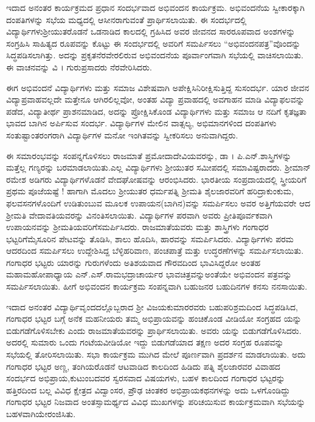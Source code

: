 {ಇದಾದ ಅನಂತರ ಕಾರ್ಯಕ್ರಮದ ಪ್ರಧಾನ ಸಂದರ್ಭವಾದ ಅಭಿವಂದನ ಕಾರ್ಯಕ್ರಮ. ಅಭಿವಂದನೆಯ ಸ್ವೀಕಾರಕ್ಕಾಗಿ ದಂಪತಿಗಳನ್ನು ಸಭೆಯ ಮಧ್ಯದಲ್ಲಿ ಆಸೀನರಾಗುವಂತೆ ಪ್ರಾರ್ಥಿಸಲಾಯಿತು. ಈ ಸಂದರ್ಭದಲ್ಲಿ ವಿದ್ಯಾರ್ಥಿಗಳು\break ಶ್ರೀಯುತ\-ರೊಡನೆ ಒಡನಾಡಿದ ಕಾಲದಲ್ಲಿ ಗ್ರಹಿಸಿದ ಅವರ ಜೀವನದ ಸಾರರೂಪವಾದ ಅಂಶಗಳನ್ನು ಸಂಗ್ರಹಿಸಿ ಸಾಹಿತ್ಯದ ರೂಪವನ್ನು ಕೊಟ್ಟು ಈ ಸಂದರ್ಭದಲ್ಲಿ ಅವರಿಗೆ ಸಮರ್ಪಿಸಲು “ಅಭಿವಂದನಪತ್ರ”ವೊಂದನ್ನು ಸಿದ್ಧಪಡಿಸಲಾಗಿತ್ತು. ಅದನ್ನು ಪ್ರಕೃತ\break ನೆರವೇರಲಿರುವ ಅಭಿವಂದನೆಯ ಪೂರ್ವಾಂಗವಾಗಿ ಸಭೆಯಲ್ಲಿ ವಾಚಿಸಲಾಯಿತು. ಈ ವಾಚನವನ್ನು ವಿ । ಗುರುಪ್ರಸಾದರು ನೆರವೇರಿಸಿದರು. 

ಈಗ ಅಭಿವಂದನೆ \enginline{-} ವಿದ್ಯಾರ್ಥಿಗಳು ಮತ್ತು ಸಮಾಜ ವಿಶೇಷವಾಗಿ ಅಪೇಕ್ಷಿಸಿ\break ನಿರೀಕ್ಷಿಸುತ್ತಿದ್ದ ಸುಸಂದರ್ಭ. ಯಾರ ಜೀವನ ವಿದ್ಯಾಪ್ರವಾಹವಲ್ಲದೇ ಮತ್ತೇನೂ ಆಗಿರ\-ಲಿಲ್ಲವೋ, ಅಂತಹ ವಿದ್ಯಾ ಪ್ರವಾಹದಲ್ಲಿ ಅವಗಾಹನ ಮಾಡಿ ವಿದ್ಯಾಫಲವನ್ನು ಪಡೆದ, ವಿದ್ಯಾತೀರ್ಥ ಪ್ರಾಶನಮಾಡಿದ, ಅದನ್ನು ಪ್ರೋಕ್ಷಿಸಿಕೊಂಡ ವಿದ್ಯಾರ್ಥಿಗಳು ಮತ್ತು ಸಮಾಜ ಆ ನದಿಗೆ ಕೃತಜ್ಞತಾ ಭಾವದ ಬಾಗಿನ ಅರ್ಪಿಸುವ ಸಂದರ್ಭ. ವಿದ್ಯಾರ್ಥಿಗಳ ಮೇಲಿನ ವಾತ್ಸಲ್ಯ, ಅಭಿಮಾನಗಳಿಂದ ದಂಪತಿಗಳು ಸಂತುಷ್ಟಾಂತರಂಗ\-ರಾಗಿ ವಿದ್ಯಾರ್ಥಿಗಳ ಮನೋ ಇಂಗಿತವನ್ನು ಸ್ವೀಕರಿಸಲು ಅನುವಾಗಿದ್ದರು. 

ಈ ಸಮಾರಂಭವನ್ನು ಸಂಪನ್ನಗೊಳಿಸಲು ರಾಜಮಾತೆ ಪ್ರಮೋದಾದೇವಿಯವ\-ರನ್ನು, ಡಾ । ಪಿ.ಎನ್.ಶಾಸ್ತ್ರಿಗಳನ್ನು ಮತ್ತೆಲ್ಲ ಗಣ್ಯರನ್ನು ಬರಮಾಡಲಾಯಿತು.ಎಲ್ಲ ವಿದ್ಯಾರ್ಥಿಗಳು ಶ್ರೀಯುತರ ಸಮೀಪದಲ್ಲಿ ಸಮಾವಿಷ್ಟರಾದರು. ಶ್ರೀಮಾನ್ ರಮೇಶ ಅಡಿಗರು ವಿದ್ಯಾರ್ಥಿಗಳೊಡನೆ ವೇದಘೋಷವನ್ನು ಆರಂಭಿಸಿದರು. ಭಾರತೀಯ ಸಂಪ್ರದಾಯದಲ್ಲಿ ಸ್ತ್ರೀಯರಿಗೆ ಪ್ರಥಮ ಪೂಜೆಯಷ್ಟೆ ! ಹಾಗಾಗಿ ಮೊದಲು ಶ್ರೀಯುತರ ಧರ್ಮಪತ್ನಿ ಶ್ರೀಮತಿ ಶೈಲಜಾರವರಿಗೆ  ಹರಿದ್ರಾಕುಂಕುಮ, ಫಲವಸನಗಳೊಂದಿಗೆ ಉಡಿತುಂಬುವ ಮೂಲಕ ಉಪಾಯನ(ಬಾಗಿನ)ವನ್ನು ಸಮರ್ಪಿಸಲು ಅವರ ಅತ್ತಿಗೆಯವರೇ ಆದ  ಶ್ರೀಮತಿ ವೇದಾವತಿಯವರನ್ನು ವಿನಂತಿಸಲಾಯಿತು. ವಿದ್ಯಾರ್ಥಿಗಳ ಪರವಾಗಿ ಅವರು ಪ್ರೀತಿಪೂರ್ವಕವಾಗಿ ಉಪಾಯನವನ್ನು ಶ್ರೀಮತಿಯವರಿಗೆ\break ಸಮರ್ಪಿಸಿದರು. ರಾಜಮಾತೆಯವರು ಮತ್ತು ಶಾಸ್ತ್ರಿಗಳು ಗಂಗಾಧರ ಭಟ್ಟರಿಗೆ\break ಮೈಸೂರಿನ ಪೇಟವನ್ನು ತೊಡಿಸಿ, ಶಾಲು ಹೊದಿಸಿ, ಹಾರವನ್ನು \hbox{ಸಮರ್ಪಿಸಿದರು}. ವಿದ್ಯಾರ್ಥಿಗಳು ಪರಮ ಆದರದಿಂದ ಸಮರ್ಪಿಸಲು ಉದ್ದೇಶಿಸಿದ್ದ ಬೆಳ್ಳಿಹರಿವಾಣ, ಪಂಚಪಾತ್ರೆ ಮತ್ತು ಉದ್ಧರಣೆಗಳನ್ನು ಸಮರ್ಪಿಸಲಾಯಿತು. ಗಂಗಾಧರ ಭಟ್ಟರು ಯಾರನ್ನು ಗುರುಗಳೆಂದು ಅತಿಶಯವಾದ ಗೌರವದಿಂದ ಭಾವಿಸಿದ್ದರೋ ಅಂತಹ ಮಹಾಮಹೋಪಾಧ್ಯಾಯ ಎನ್.ಎಸ್.ರಾಮಭದ್ರಾಚಾರ್ಯರ ಭಾವಚಿತ್ರವನ್ನು\break ಅಂತೆಯೇ ಅಭಿವಂದನ ಪತ್ರವನ್ನು ಸಮರ್ಪಿಸಲಾಯಿತು. ಹೀಗೆ ಅಭಿವಂದನ ಕಾರ್ಯಕ್ರಮ ಸಂಪನ್ನವಾಗಿ ಬಹುಜನರ ಬಹುದಿನಗಳ  ಕನಸು ನನಸಾಯಿತು. 
\vskip 8pt

ಇದಾದ ಅನಂತರ ವಿದ್ಯಾರ್ಥಿವೃಂದದಲ್ಲೊಬ್ಬರಾದ ಶ್ರೀ ವಿಜಯಕುಮಾರರವರು ಬಹುಪರಿಶ್ರಮದಿಂದ ಸಿದ್ಧಪಡಿಸಿದ, ಗಂಗಾಧರ ಭಟ್ಟರ ಬಗ್ಗೆ ಅನೆಕ ಮಹನೀಯರು ತಮ್ಮ ಅಭಿಪ್ರಾಯವನ್ನು ಹಂಚಿಕೊಂಡ ವೀಡಿಯೋ ಸಂಗ್ರಹದ  ಯನ್ನು ಬಿಡುಗಡೆ\-ಗೊಳಿಸಬೇಕು ಎಂದು ರಾಜಮಾತೆಯವರನ್ನು ಪ್ರಾರ್ಥಿಸಲಾಯಿತು. ಅವರು  ಯನ್ನು ಬಿಡುಗಡೆಗೊಳಿಸಿದರು. ಅದರಲ್ಲಿ ಸುಮಾರು ಒಂದು ಗಂಟೆಯ\break ವೀಡಿಯೋ ಇದ್ದು ಬಿಡುಗಡೆಯಾದ ತಕ್ಷಣ ಅದರ ಸಂಗ್ರಹ ರೂಪವನ್ನು ಸಭೆಯಲ್ಲಿ ತೋರಿಸಲಾಯಿತು. ಸಭಾ ಕಾರ್ಯಕ್ರಮ ಮುಗಿದ ಮೇಲೆ ಪೂರ್ಣವಾಗಿ ಪ್ರದರ್ಶನ ಮಾಡಲಾಯಿತು. ಅದು ಗಂಗಾಧರ ಭಟ್ಟರ ಅಣ್ಣ, ತಂಗಿಯರೊಡನೆ ಆಟವಾಡಿದ ಕಾಲದಿಂದ ಹಿಡಿದು ಪತ್ನಿ \enginline{-} ಶೈಲಜಾರವರ ವಿವಾಹದ ಸಂದರ್ಭದ ಅಭಿಪ್ರಾಯ,\break ಕುಟುಂಬದವರ ಸ್ವರಸವಾದ ವಿಷಯಗಳು, ಬಹಳ ಕಾಲದಿಂದ ಗಂಗಾಧರ ಭಟ್ಟರನ್ನು ಹತ್ತಿರದಿಂದ ಬಲ್ಲ ವಿವಿಧ ಕ್ಷೇತ್ರದ ವಿದ್ವಾಂಸರ, ಪ್ರೌಢ ಚಿಂತಕರ ಅಭಿಪ್ರಾಯಕಥನ\-ಗಳನ್ನು ಅದು ಒಳಗೊಂಡಿದ್ದು ಗಂಗಾಧರ ಭಟ್ಟರ ನಿಜವಾದ ಅಂತಸ್ಸಾಮರ್ಥ್ಯದ ವಿವಿಧ ಮುಖಗಳನ್ನು ಪರಿಚಯಿಸುವ ಕಾರ್ಯಕ್ರಮವಾಗಿ ಸಭೆಯನ್ನು ಬಹಳವಾಗಿಯೇ\break  ರಂಜಿಸಿತು.

}

